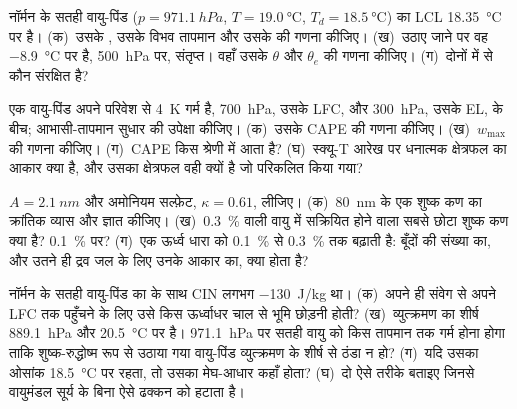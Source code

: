 \begin{exercise}[$\star\star$]\label{exo:b2:atmospheric-thermodynamics:7}
नॉर्मन के सतही वायु-पिंड ($p = \qty{971.1}{hPa}$, $T = \qty{19.0}{\celsius}$, $T_d =
\qty{18.5}{\celsius}$) का LCL \qty{18.35}{\celsius} पर है। (क)~उसके , उसके
विभव तापमान और उसके  की गणना कीजिए। (ख)~उठाए जाने पर वह
\qty{-8.9}{\celsius} पर है, \qty{500}{hPa} पर, संतृप्त। वहाँ उसके $\theta$ और $\theta_e$ की गणना कीजिए।
(ग)~दोनों में से कौन संरक्षित है?
\end{exercise}

\begin{exercise}[$\star\star$]\label{exo:b2:atmospheric-thermodynamics:8}
एक वायु-पिंड अपने परिवेश से \qty{4}{K} गर्म है, \qty{700}{hPa}, उसके LFC, और
\qty{300}{hPa}, उसके EL, के बीच; आभासी-तापमान सुधार की उपेक्षा कीजिए। (क)~उसके CAPE की गणना कीजिए। (ख)~$w_{\max}$
की गणना कीजिए। (ग)~CAPE किस श्रेणी में आता है? (घ)~स्क्यू-T आरेख पर धनात्मक क्षेत्रफल का
आकार क्या है, और उसका क्षेत्रफल वही क्यों है जो परिकलित किया गया?
\end{exercise}

\begin{exercise}[$\star\star$]\label{exo:b2:atmospheric-thermodynamics:9}
$A = \qty{2.1}{nm}$ और अमोनियम सल्फ़ेट, $\kappa = 0.61$, लीजिए। (क)~\qty{80}{nm} के एक शुष्क कण का
क्रांतिक व्यास और  ज्ञात कीजिए। (ख)~\qty{0.3}{\percent}  वाली वायु में सक्रियित होने वाला
सबसे छोटा शुष्क कण क्या है? \qty{0.1}{\percent} पर? (ग)~एक ऊर्ध्व धारा
 को \qty{0.1}{\percent} से \qty{0.3}{\percent} तक बढ़ाती है: बूँदों की संख्या का,
और उतने ही द्रव जल के लिए उनके आकार का, क्या होता है?
\end{exercise}

\begin{exercise}[$\star\star\star$]\label{exo:b2:atmospheric-thermodynamics:10}
नॉर्मन के सतही वायु-पिंड का  के साथ CIN लगभग \qty{-130}{J/kg} था।
(क)~अपने ही संवेग से अपने LFC तक पहुँचने के लिए उसे किस ऊर्ध्वाधर चाल से भूमि छोड़नी होती?
(ख)~व्युत्क्रमण का शीर्ष \qty{889.1}{hPa} और \qty{20.5}{\celsius} पर है। \qty{971.1}{hPa} पर सतही वायु
को किस तापमान तक गर्म होना होगा ताकि शुष्क-रुद्धोष्म रूप से उठाया गया वायु-पिंड
व्युत्क्रमण के शीर्ष से ठंडा न हो? (ग)~यदि उसका ओसांक
\qty{18.5}{\celsius} पर रहता, तो उसका मेघ-आधार कहाँ होता? (घ)~दो ऐसे तरीके बताइए जिनसे वायुमंडल
सूर्य के बिना ऐसे ढक्कन को हटाता है।
\end{exercise}

